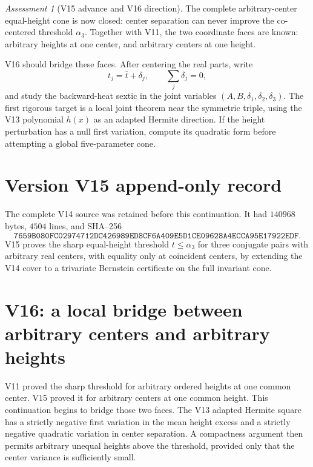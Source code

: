 \documentclass[11pt]{article}
\theoremstyle{definition}
\theoremstyle{remark}
\newtheorem{assessment}[theorem]{Assessment}
\begin{document}
\begin{assessment}[V15 advance and V16 direction]
The complete arbitrary-center equal-height cone is now closed:
center separation can never improve the co-centered threshold
\(\alpha_3\).  Together with V11, the two coordinate faces are known:
arbitrary heights at one center, and arbitrary centers at one height.

V16 should bridge these faces.  After centering the real parts, write
\[
 t_j=\bar t+\delta_j,\qquad \sum_j\delta_j=0,
 \tag{N15.25}
\]
and study the backward-heat sextic in the joint variables
\((A,B,\delta_1,\delta_2,\delta_3)\).  The first rigorous target is a local
joint theorem near the symmetric triple, using the V13 polynomial
\(h(x)\) as an adapted Hermite direction.  If the height perturbation has
a null first variation, compute its quadratic form before attempting a
global five-parameter cone.
\end{assessment}

\section*{Version V15 append-only record}
The complete V14 source was retained before this continuation.  It had
\(140968\) bytes, \(4504\) lines, and SHA--256
\[
 \texttt{7659B080FC02974712DC426989ED8CF6A409E5D1CE09628A4ECCA95E17922EDF}.
\]
V15 proves the sharp equal-height threshold \(t\leq\alpha_3\) for three
conjugate pairs with arbitrary real centers, with equality only at
coincident centers, by extending the V14 cover to a trivariate Bernstein
certificate on the full invariant cone.




\section{V16: a local bridge between arbitrary centers and arbitrary heights}

V11 proved the sharp threshold for arbitrary ordered heights at one common
center.  V15 proved it for arbitrary centers at one common height.  This
continuation begins to bridge those two faces.  The V13 adapted Hermite
square has a strictly negative first variation in the mean height excess
and a strictly negative quadratic variation in center separation.  A
compactness argument then permits arbitrary unequal heights above the
threshold, provided only that the center variance is sufficiently small.
\end{document}
